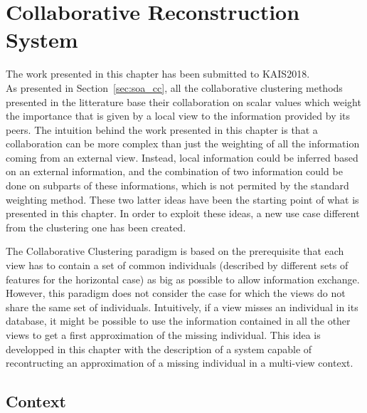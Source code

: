%
\chapter{Collaborative Reconstruction System}

\minitoc{}
\newpage

The work presented in this chapter has been submitted to KAIS2018.\\

As presented in Section~\ref{sec:soa_cc}, all the collaborative clustering methods presented in the litterature base their collaboration on scalar values which weight the importance that is given by a local view to the information provided by its peers. The intuition behind the work presented in this chapter is that a collaboration can be more complex than just the weighting of all the information coming from an external view. Instead, local information could be inferred based on an external information, and the combination of two information could be done on subparts of these informations, which is not permited by the standard weighting method. These two latter ideas have been the starting point of what is presented in this chapter. In order to exploit these ideas, a new use case different from the clustering one has been created.

The Collaborative Clustering paradigm is based on the prerequisite that each view has to contain a set of common individuals (described by different sets of features for the horizontal case) as big as possible to allow information exchange. However, this paradigm does not consider the case for which the views do not share the same set of individuals. Intuitively, if a view misses an individual in its database, it might be possible to use the information contained in all the other views to get a first approximation of the missing individual. This idea is developped in this chapter with the description of a system capable of recontructing an approximation of a missing individual in a multi-view context.\\

\section{Context}
\label{sec:crs_context}

